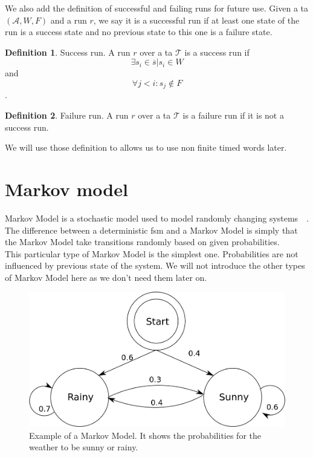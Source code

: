 \documentclass[12pt]{article}
\theoremstyle{definition}
\newtheorem{definition}{Definition}[section]
\theoremstyle{definition}
\theoremstyle{remark}
\newcommand{\A}{\mathcal{A}}
\begin{document}
We also add the definition of successful and failing runs for future use. Given a \gls{ta} $(\A, W, F)$ and a run $r$, we say it is a successful run if at least one state of the run is a success state and no previous state to this one is a failure state.

\begin{definition}{Success run.} A run $r$ over a \gls{ta} $\mathcal{T}$ is a success run if
$$\exists s_i \in \overline{s} | s_i \in W$$ and $$\forall j < i: s_j \notin F$$.
\end{definition}

\begin{definition}{Failure run.} A run $r$ over a \gls{ta} $\mathcal{T}$ is a failure run if it is not a success run.
\end{definition}

We will use those definition to allows us to use non finite timed words later.



\section{Markov model}
\label{sec:markov}


Markov Model is a stochastic model used to model randomly changing systems~\cite{1165342}~\cite{MarkovModel:2017}. The difference between a deterministic \gls{fsm} and a Markov Model is simply that the Markov Model take transitions randomly based on given probabilities.\\

This particular type of Markov Model is the simplest one. Probabilities are not influenced by previous state of the system. We will not introduce the other types of Markov Model here as we don't need them later on.

\begin{figure}
    \centering
    \includegraphics[scale=1.6]{MarkovModel.png}
    \caption{Example of a Markov Model. It shows the probabilities for the weather to be sunny or rainy.}
    \label{MarkovModel}
\end{figure}
\end{document}
